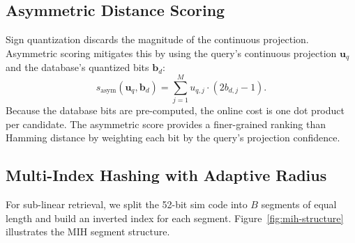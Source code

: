 \documentclass[11pt,a4paper]{article}
\begin{document}
\subsection{Asymmetric Distance Scoring}

Sign quantization discards the magnitude of the continuous projection. Asymmetric scoring mitigates this by using the query's continuous projection $\mathbf{u}_q$ and the database's quantized bits $\mathbf{b}_d$:
\begin{equation}
    s_{\text{asym}}(\mathbf{u}_q, \mathbf{b}_d) = \sum_{j=1}^{M} u_{q,j} \cdot (2 b_{d,j} - 1).
\end{equation}
Because the database bits are pre-computed, the online cost is one dot product per candidate. The asymmetric score provides a finer-grained ranking than Hamming distance by weighting each bit by the query's projection confidence.

\subsection{Multi-Index Hashing with Adaptive Radius}

For sub-linear retrieval, we split the 52-bit sim code into $B$ segments of equal length and build an inverted index for each segment. Figure~\ref{fig:mih-structure} illustrates the MIH segment structure.
\end{document}
